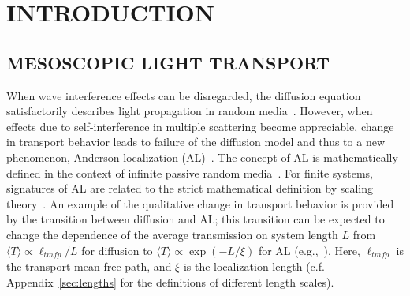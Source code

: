 \chapter{INTRODUCTION}
\label{chap:introduction}



\section{MESOSCOPIC LIGHT TRANSPORT}
\label{sec:what_field_am_i_in}
When wave interference effects can be disregarded, the diffusion equation satisfactorily describes light propagation in random media\mbox{~\cite{2009_Lagendijk_PT,1999_van_Rossum}}. However, when effects due to self-interference in multiple scattering become appreciable, change in transport behavior leads to failure of the diffusion model and thus to a new phenomenon, Anderson localization (AL)~\cite{1958_Anderson}. The concept of AL is mathematically defined in the context of infinite passive random media~\cite{1983_Frohlich,1988_Lifshits,1989_Dreifus}. For finite systems, signatures of AL are related to the strict mathematical definition by scaling theory~\cite{1979_Anderson,1981_MacKinnon_scaling,2006_Markos}. An example of the qualitative change in transport behavior is provided by the transition between diffusion and AL; this transition can be expected to change the dependence of the average transmission on system length $L$ from $\langle T \rangle \propto \ell_{tmfp}/L$ for diffusion to $\langle T \rangle \propto \exp(-L/\xi)$ for AL (e.g.,~\cite{1999_van_Tiggelen}). Here, $\ell_{tmfp}$ is the transport mean free path, and $\xi$ is the localization length (c.f. Appendix~\ref{sec:lengths} for the definitions of different length scales). 

